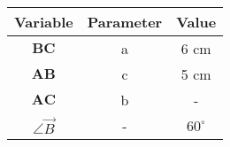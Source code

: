 \begin{center}
    \begin{tabular}{|c|c|c|} 
        \hline
            \textbf{Variable} & \textbf{Parameter} & \textbf{Value} \\ 
        \hline
            $\boldsymbol{BC}$ & a & 6 cm \\ 
        \hline
            $\boldsymbol{AB}$ & c & 5 cm \\ 
        \hline
            $\boldsymbol{AC}$ & b &   -    \\
        \hline
            $\angle \vec{B}$  & -  & $60^\circ$ \\
        \hline
    \end{tabular}
\end{center}  


